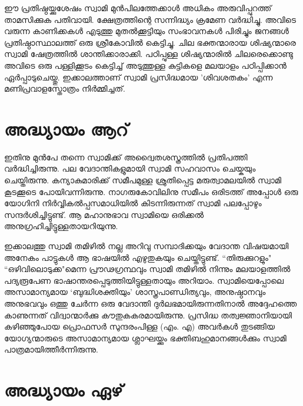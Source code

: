 \documentclass[12pt,openany]{book}
\begin{document}
	ഈ പ്രതിഷ്ഠയ്ക്കുശേഷം സ്വാമി മുൻപിലത്തേക്കാൾ അധികം അരുവിപ്പുറത്ത് താമസിക്കുക പതിവായി. ക്ഷേത്രത്തിന്റെ സന്നിദ്ധ്യം ക്രമേണ വർദ്ധിച്ചു. അവിടെ വരുന്ന കാണിക്കകൾ എടുത്തു മുതൽക്കൂട്ടിയും സംഭാവനകൾ പിരിച്ചും ജനങ്ങൾ പ്രതിഷ്ഠാസ്ഥാലത്ത് ഒരു ശ്രീകോവിൽ കെട്ടിച്ചു. ചില ഭക്തന്മാരായ ശിഷ്യന്മാരെ സ്വാമി ഷേത്രത്തിൽ ശാന്തിക്കാരാക്കി. പഠിപ്പുള്ള ശിഷ്യന്മാരിൽ ചിലരെക്കൊണ്ടു അവിടെ ഒരു പള്ളിക്കൂടം കെട്ടിച്ച് അടുത്തുള്ള കുട്ടികളെ മലയാളം പഠിപ്പിക്കാൻ ഏർപ്പാടുചെയ്തു. ഇക്കാലത്താണ് സ്വാമി പ്രസിദ്ധമായ 'ശിവശതകം' എന്ന മണിപ്രവാളസ്തോത്രം നിർമ്മിച്ചത്.
	
	\newpage
	
	\chapter*{അദ്ധ്യായം ആറ്}
	
	ഇതിനു മുൻപേ തന്നെ സ്വാമിക്ക് അദ്വൈതശസ്ത്രത്തിൽ പ്രതിപത്തി വർദ്ധിച്ചിരുന്നു. പല വേദാന്തികളുമായി സ്വാമി സഹവാസം ചെയ്കയും ചെയ്തിരുന്നു. കന്യാകുമാരിക്ക് സമീപമുള്ള ശ്രുതിപ്പെട്ട മരുത്വാമലയിൽ സ്വാമി കൂടക്കൂടെ പോയിവന്നിരുന്നു. നാഗരുകോവിലിനു സമീപം ഒരിടത്ത് അപ്പോൾ ഒരു യോഗിനി നിർവ്വികൽപ്പസമാധിയിൽ കിടന്നിരുന്നത് സ്വാമി പലപ്പോഴും സന്ദർശിച്ചിട്ടുണ്ട്. ആ മഹാനുഭാവ സ്വാമിയെ ഒരിക്കൽ അനുഗ്രഹിച്ചിട്ടുള്ളതായറിയുന്നു.
	
	ഇക്കാലത്തു സ്വാമി തമിഴിൽ നല്ല അറിവു സമ്പാദിക്കയും വേദാന്ത വിഷയമായി അനേകം പാട്ടുകൾ ആ ഭാഷയിൽ എഴുതുകയും ചെയ്തിട്ടുണ്ട്. ``തിരുക്കുറളും" ``ഒഴിവിലൊടുക്ക"മെന്ന പ്രൗഢഗ്രന്ഥവും സ്വാമി തമിഴിൽ നിന്നും മലയാളത്തിൽ പദ്യരൂപേണ ഭാഷാന്തരപ്പെടുത്തിയിട്ടുള്ളതായും അറിയാം. സ്വാമിയെപ്പോലെ അസാമാന്യമായ `ബുദ്ധിശക്തിയും' ശാസ്ത്രപാണ്ഡിത്യവും, അനുഷ്ഠാനവും അനുഭവവും ഒത്തു ചേർന്ന ഒരു വേദാന്തി ദുർലഭമായിരുന്നതിനാൽ അദ്ദേഹത്തെ കാണുന്നത് വിദ്വാന്മാർക്കു കൗതുകകരമായിരുന്നു. പ്രസിദ്ധ തത്വജ്ഞാനിയായി കഴിഞ്ഞുപോയ പ്രൊഫസർ സുന്ദരംപിള്ള (എം. എ) അവർകൾ തുടങ്ങിയ യോഗ്യന്മാരുടെ അസാമാന്യമായ ശ്ലാഘയ്ക്കും ഭക്തിബഹുമാനങ്ങൾക്കും സ്വാമി പാത്രമായിത്തീർന്നിരുന്നു.
	
	\newpage
	
	\chapter*{അദ്ധ്യായം ഏഴ്}
	
\end{document}
